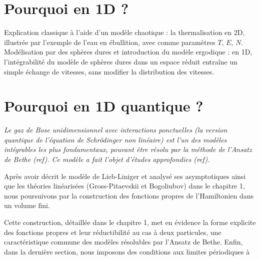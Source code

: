 \section*{Pourquoi en 1D ?}

{\em 

Explication classique à l’aide d’un modèle chaotique : la thermalisation en 2D, illustrée par l’exemple de l’eau en ébullition, avec comme paramètres \(T\), \(E\), \(N\). Modélisation par des sphères dures et introduction du modèle ergodique : en 1D, l’intégrabilité du modèle de sphères dures dans un espace réduit entraîne un simple échange de vitesses, sans modifier la distribution des vitesses.

}

\section*{Pourquoi en 1D quantique ?}

{\em 
Le gaz de Bose unidimensionnel avec interactions ponctuelles (la version quantique de l’équation de Schrödinger non linéaire) est l’un des modèles intégrables les plus fondamentaux, pouvant être résolu par la méthode de l’Ansatz de Bethe ({ref}). Ce modèle a fait l’objet d’études approfondies ({ref}).  

Après avoir décrit le modèle de Lieb-Liniger et analysé ses asymptotiques ainsi que les théories linéarisées (Gross-Pitaevskii et Bogoliubov) dans le chapitre 1, nous poursuivons par la construction des fonctions propres de l’Hamiltonien dans un volume fini.  

Cette construction, détaillée dans le chapitre 1, met en évidence la forme explicite des fonctions propres et leur réductibilité au cas à deux particules, une caractéristique commune des modèles résolubles par l’Ansatz de Bethe. Enfin, dans la dernière section, nous imposons des conditions aux limites périodiques à %
}